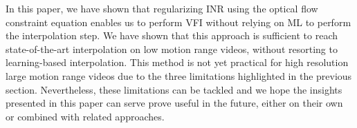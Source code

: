 \documentclass{article}
\begin{document}
In this paper, we have shown that regularizing INR using the optical flow constraint equation
enables us to perform VFI without relying on ML to perform the interpolation step.
We have shown that this approach is sufficient to reach state-of-the-art interpolation on low motion range videos,
without resorting to learning-based interpolation.
This method is not yet practical for high resolution large motion range videos due to the three limitations highlighted in the previous section.
Nevertheless, these limitations can be tackled and we hope the insights presented in this paper can serve prove useful in the future,
either on their own or combined with related approaches.



\end{document}
